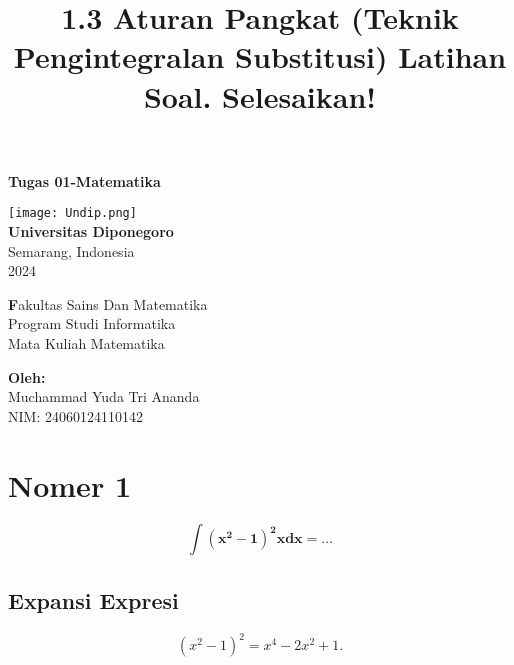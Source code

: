 \documentclass{article}
\title{1.3 Aturan Pangkat (Teknik Pengintegralan Substitusi)
Latihan Soal. Selesaikan!}
\author{}
\date{}
\begin{document}
\begin{titlepage}
    \begin{center}
        \vspace*{1cm}
        
        {\LARGE \textbf{Tugas 01-Matematika}}
        
        \vspace{2cm}
        
        \texttt{[image: Undip.png]}\\
        \vspace{1cm}
        \textbf{Universitas Diponegoro}\\
        Semarang, Indonesia\\
        2024
        
        \vspace{1cm}
        
          \textbf
        Fakultas Sains Dan Matematika\\
        Program Studi Informatika\\
        Mata Kuliah Matematika\\
        
        
        \vspace{2cm}
            \vfill
        
      
        \textbf{Oleh:}\\
        Muchammad Yuda Tri Ananda\\
        NIM: 24060124110142
        
    \end{center}
\end{titlepage}


\newpage
\onehalfspacing

\maketitle

\section{Nomer 1}

\[
\bm{\int\left(x^2-1\right)^2 x d x=\ldots}
\] 


\subsection{Expansi Expresi}


\[
(x^2 - 1)^2 = x^4 - 2x^2 + 1.
\]
\end{document}
